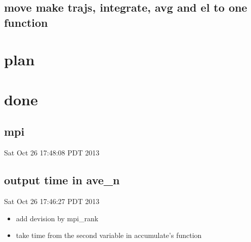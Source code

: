 \documentclass{article}
\let\Item\item
\renewcommand\item{\normalcolor\Item}
\newcommand\done{\color[RGB]{129, 180, 185} \ding{52} }
\begin{document}
\subsection{move make trajs, integrate, avg and el to one function}
\section{plan}
\section{done}
\subsection{mpi}
Sat Oct 26 17:48:08 PDT 2013
\subsection{output time in ave\_n}
Sat Oct 26 17:46:27 PDT 2013
\begin{itemize}
  \item \done add devision by mpi\_rank
  \item \done take time from the second variable in accumulate's function
\end{itemize}
\end{document}
